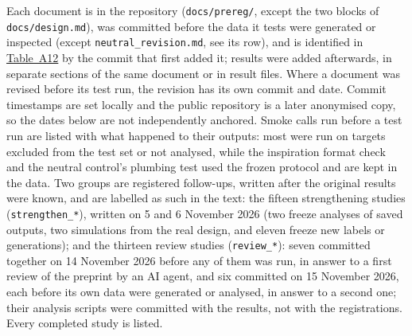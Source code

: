 \documentclass[
  10pt,
]{article}
\begin{document}
Each document is in the repository
(\texttt{docs/\allowbreak{}prereg/\allowbreak{}},
except the two blocks of
\texttt{docs/\allowbreak{}design.md}),
was committed before the data it tests
were generated or inspected (except
\texttt{neutral\_\allowbreak{}revision.md},
see its row), and is identified in
\hyperref[tab:A12]{Table~A12} by the
commit that first added it; results were
added afterwards, in separate sections
of the same document or in result files.
Where a document was revised before its
test run, the revision has its own
commit and date. Commit timestamps are
set locally and the public repository is
a later anonymised copy, so the dates
below are not independently anchored.
Smoke calls run before a test run are
listed with what happened to their
outputs: most were run on targets
excluded from the test set or not
analysed, while the inspiration format
check and the neutral control's plumbing
test used the frozen protocol and are
kept in the data. Two groups are
registered follow-ups, written after the
original results were known, and are
labelled as such in the text: the
fifteen strengthening studies
(\texttt{strengthen\_\allowbreak{}*}),
written on 5 and 6 November 2026 (two
freeze analyses of saved outputs, two
simulations from the real design, and
eleven freeze new labels or
generations); and the thirteen review
studies
(\texttt{review\_\allowbreak{}*}): seven
committed together on 14 November 2026
before any of them was run, in answer to
a first review of the preprint by an AI
agent, and six committed on 15 November
2026, each before its own data were
generated or analysed, in answer to a
second one; their analysis scripts were
committed with the results, not with the
registrations. Every completed study is
listed.
\end{document}
